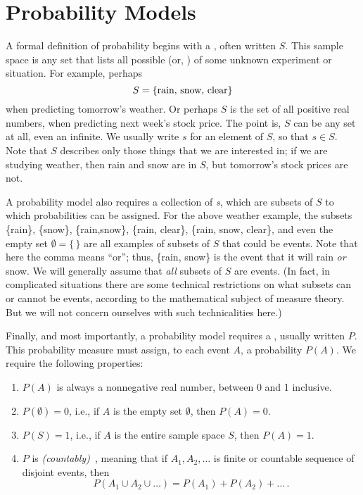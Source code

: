 \section{Probability Models}
A formal definition of probability begins with a , often written  $S$. This
sample space is any set that lists all possible  (or, )
of some unknown experiment or situation. For example, perhaps
\begin{equation}
    S =  \text{\{rain, snow, clear\}} \notag
\end{equation}
when predicting tomorrow's weather. Or perhaps $S$ is the set of all positive real numbers, when predicting next
week's stock price. The point is, $S$ can be any set at all, even an infinite. We usually write $s$ for an element of
$S$, so that $s \in S$. Note that $S$ describes only those things that we are interested in; if we are studying
weather, then rain and snow are in $S$, but tomorrow's stock prices are not.

A probability model also requires a collection of \emph{s}, which are subsets of $S$ to which
probabilities can be assigned. For the above weather example, the subsets \{rain\}, \{snow\}, \{rain,snow\}, \{rain,
clear\}, \{rain, snow, clear\}, and even the empty set $\emptyset = \{\,\}$ are all examples of subsets of $S$ that
could be events. Note that here the comma means ``or''; thus, \{rain, snow\} is the event that it will rain \emph{or}
snow. We will generally assume that \emph{all} subsets of $S$ are events. (In fact, in complicated situations there
are some technical restrictions on what subsets can or cannot be events, according to the mathematical subject of
measure theory. But we will not concern ourselves with such technicalities here.)

Finally, and most importantly, a probability model requires a ,
usually written $P$. This probability measure must assign, to each event $A$, a probability $P(A)$. We require the
following properties:
\begin{enumerate}
    \item $P(A)$ is always a nonnegative real number, between 0 and 1 inclusive.
    \item $P(\emptyset) = 0$, i.e., if $A$ is the empty set $\emptyset$, then $P(A)=0$.
    \item $P(S)=1$, i.e., if $A$ is the entire sample space $S$, then $P(A)=1$.
    \item $P$ is \emph{(countably)}~, meaning that if $A_1, A_2, \dots$ is
    finite or countable
    sequence of
    disjoint events, then
    \begin{equation}\label{eq:additive_rule}
        P(A_1 \cup A_2 \cup \ldots) = P(A_1) + P(A_2) + \ldots\,.
    \end{equation}
\end{enumerate}

